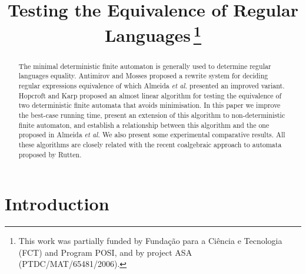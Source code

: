 \documentclass[copyright]{eptcs}
\begin{document}
\title{Testing the Equivalence of Regular Languages\,\thanks{This work was partially funded by Funda\c{c}\~ao para a
  Ci\^encia e Tecnologia (FCT) and Program POSI, and by project ASA
  (PTDC/MAT/65481/2006).}}
\def\titlerunning{Testing the Equivalence of Regular Languages}

\author{\hspace{40mm}\hspace{40mm}
}

\def\authorrunning{M.~Almeida, N.~Moreira, R.~Reis}

\maketitle

\begin{abstract}
  The minimal deterministic finite automaton is generally used to
  determine regular languages equality. Antimirov and Mosses proposed
  a rewrite system for deciding regular expressions equivalence of
  which Almeida {\em et al.} presented an improved variant. Hopcroft
  and Karp proposed an almost linear algorithm for testing the
  equivalence of two deterministic finite automata that avoids
  minimisation.
  In this paper we improve the best-case running time, present an
  extension of this algorithm to non-deterministic finite automaton,
  and establish a relationship between this algorithm and the one
  proposed in Almeida {\em et al.} We also present some experimental
  comparative results. All these algorithms are closely related with
  the recent coalgebraic approach to automata proposed by Rutten.
\end{abstract}

\section{Introduction}
\end{document}
